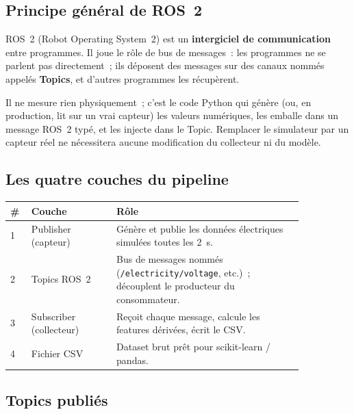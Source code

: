 \documentclass[12pt,a4paper]{article}
\begin{document}
\subsection{Principe général de ROS~2}

ROS~2 (Robot Operating System~2) est un \textbf{intergiciel de communication}
entre programmes. Il joue le rôle de bus de messages~: les programmes ne
se parlent pas directement~; ils déposent des messages sur des canaux
nommés appelés \textbf{Topics}, et d'autres programmes les récupèrent.

Il ne mesure rien physiquement~; c'est le code Python qui génère
(ou, en production, lit sur un vrai capteur) les valeurs numériques,
les emballe dans un message ROS~2 typé, et les injecte dans le Topic.
Remplacer le simulateur par un capteur réel ne nécessitera aucune
modification du collecteur ni du modèle.

\subsection{Les quatre couches du pipeline}

\begin{center}
\begin{tabular}{p{0.05\linewidth} p{0.25\linewidth} p{0.55\linewidth}}
\toprule
\textbf{\#} & \textbf{Couche} & \textbf{Rôle} \\
\midrule
1 & Publisher (capteur) &
  Génère et publie les données électriques simulées toutes les 2~s. \\
2 & Topics ROS~2 &
  Bus de messages nommés (\texttt{/electricity/voltage}, etc.)~;
  découplent le producteur du consommateur. \\
3 & Subscriber (collecteur) &
  Reçoit chaque message, calcule les features dérivées, écrit le CSV. \\
4 & Fichier CSV &
  Dataset brut prêt pour scikit-learn / pandas. \\
\bottomrule
\end{tabular}
\end{center}

\subsection{Topics publiés}
\end{document}
